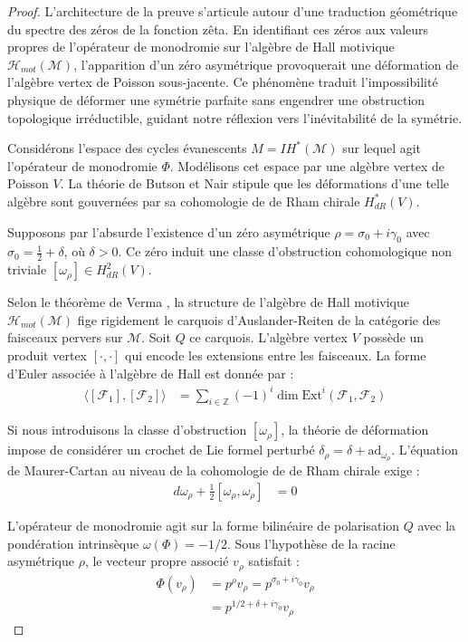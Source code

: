 \documentclass[
]{article}
\begin{document}
\begin{proof}
L'architecture de la preuve s'articule autour d'une traduction géométrique du spectre des zéros de la fonction zêta. En identifiant ces zéros aux valeurs propres de l'opérateur de monodromie sur l'algèbre de Hall motivique $\mathcal{H}_{mot}(\mathcal{M})$, l'apparition d'un zéro asymétrique provoquerait une déformation de l'algèbre vertex de Poisson sous-jacente. Ce phénomène traduit l'impossibilité physique de déformer une symétrie parfaite sans engendrer une obstruction topologique irréductible, guidant notre réflexion vers l'inévitabilité de la symétrie.

Considérons l'espace des cycles évanescents $M = IH^*(\mathcal{M})$ sur lequel agit l'opérateur de monodromie $\Phi$. Modélisons cet espace par une algèbre vertex de Poisson $V$. La théorie de Butson et Nair stipule que les déformations d'une telle algèbre sont gouvernées par sa cohomologie de de Rham chirale $H^*_{dR}(V)$.

Supposons par l'absurde l'existence d'un zéro asymétrique $\rho = \sigma_0 + i \gamma_0$ avec $\sigma_0 = \frac{1}{2} + \delta$, où $\delta > 0$. Ce zéro induit une classe d'obstruction cohomologique non triviale $[\omega_\rho] \in H^2_{dR}(V)$.

Selon le théorème de Verma \cite{verma2026}, la structure de l'algèbre de Hall motivique $\mathcal{H}_{mot}(\mathcal{M})$ fige rigidement le carquois d'Auslander-Reiten de la catégorie des faisceaux pervers sur $\mathcal{M}$. Soit $Q$ ce carquois. L'algèbre vertex $V$ possède un produit vertex $[ \cdot, \cdot ]$ qui encode les extensions entre les faisceaux. La forme d'Euler associée à l'algèbre de Hall est donnée par :
\begin{align*}
    \langle [\mathcal{F}_1], [\mathcal{F}_2] \rangle &= \sum_{i \in \mathbb{Z}} (-1)^i \dim \text{Ext}^i(\mathcal{F}_1, \mathcal{F}_2)
\end{align*}

Si nous introduisons la classe d'obstruction $[\omega_\rho]$, la théorie de déformation impose de considérer un crochet de Lie formel perturbé $\delta_\rho = \delta + \text{ad}_{\omega_\rho}$. L'équation de Maurer-Cartan au niveau de la cohomologie de de Rham chirale exige :
\begin{align*}
    d \omega_\rho + \frac{1}{2} [\omega_\rho, \omega_\rho] &= 0
\end{align*}

L'opérateur de monodromie agit sur la forme bilinéaire de polarisation $Q$ avec la pondération intrinsèque $\omega(\Phi) = -1/2$. Sous l'hypothèse de la racine asymétrique $\rho$, le vecteur propre associé $v_\rho$ satisfait :
\begin{align*}
    \Phi(v_\rho) &= p^\rho v_\rho = p^{\sigma_0 + i \gamma_0} v_\rho \\
    &= p^{1/2 + \delta + i \gamma_0} v_\rho
\end{align*}


\end{proof}
\end{document}

